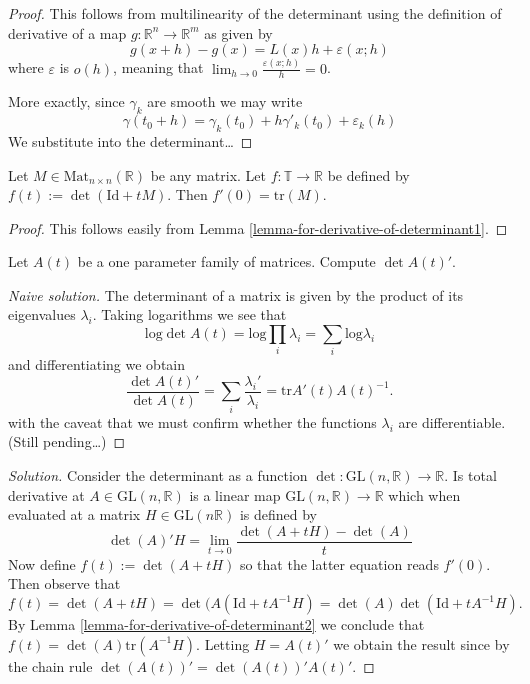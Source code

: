 \begin{proof}
This follows from multilinearity of the determinant using the definition of
derivative of a map $g:\mathbb{R}^n \to \mathbb{R}^m$ as given by
$$
g(x+h)-g(x)=L(x)h+\varepsilon(x;h)
$$
where $\varepsilon$ is $o(h)$, meaning that  $\lim_{h \to 0}
\frac{\varepsilon(x;h)}{h}=0$.

More exactly, since $\gamma_k$ are smooth we may write
$$
\gamma(t_0+h)=\gamma_k(t_0)+h\gamma'_k(t_0)+\varepsilon_k(h)
$$
We substitute into the determinant…
\end{proof}

\begin{lemma}
\label{lemma-for-derivative-of-determinant2}
Let $M \in \text{Mat}_{n\times n}(\mathbb{R})$ be any matrix. Let 
$f:\mathbb{T}\to \mathbb{R}$ be defined by $f(t):=\det(\text{Id}+tM)$. Then 
$f'(0)=\text{tr}(M)$.
\end{lemma}

\begin{proof}
This follows easily from Lemma \ref{lemma-for-derivative-of-determinant1}.
\end{proof}

\begin{exercise}
\label{exercise-derivative-of-determinant}
Let $A(t)$ be a one parameter family of matrices. Compute $\det A(t)'$.
\end{exercise}

\begin{proof}[Naive solution]
The determinant of a matrix is given by the product of its eigenvalues
$\lambda_i$. Taking logarithms we see that
$$
\text{log}\det A(t)=\text{log}\prod_{i}\lambda_i=\sum_{i}\text{log}\lambda_i
$$
and differentiating we obtain
$$
\frac{\det A(t)'}{\det A(t)}=\sum_i \frac{\lambda_i'}{\lambda_i}
=\text{tr} A'(t)A(t)^{-1}.
$$
with the caveat that we must confirm whether the functions $\lambda_i$ are
differentiable. (Still pending…)
\end{proof}

\begin{proof}[Solution]
Consider the determinant as a function 
$\det:\text{GL}(n,\mathbb{R})\to\mathbb{R}$. Is total derivative at 
$A \in \text{GL}(n,\mathbb{R})$ is a linear map 
$\text{GL}(n,\mathbb{R})\to \mathbb{R}$ which when evaluated at a matrix
$H\in\text{GL}(n\mathbb{R})$ is defined by
$$
\det(A)'H=\lim_{t\to0}\frac{\det(A+tH)-\det(A)}{t} 
$$
Now define $f(t):=\det(A+tH)$ so that the latter equation reads $f'(0)$. Then
observe that
$$
f(t)=\det(A+tH)=\det(A(\text{Id}+tA^{-1}H)=\det(A)\det(\text{Id}+tA^{-1}H).
$$
By Lemma \ref{lemma-for-derivative-of-determinant2} we conclude that 
$f(t)=\det(A)\text{tr}(A^{-1}H)$. Letting $H=A(t)'$ we obtain the result since
by the chain rule $\det(A(t))'=\det(A(t))'A(t)'$.
\end{proof}

